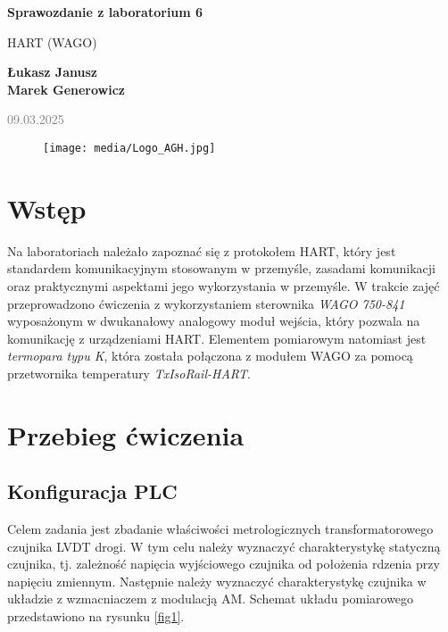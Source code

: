 \documentclass{article}
\begin{document}
\begin{titlepage}
    \begin{center}
        \vspace*{1cm}
            
        \Huge
        \textbf{Sprawozdanie z laboratorium 6}
            
        \vspace{0.5cm}
        \LARGE
        HART (WAGO)
            
        \vspace{1.5cm}
            
        \textbf{Łukasz Janusz\\Marek Generowicz}

        \normalsize      
        \textcolor{gray}{09.03.2025}
        \vfill
        \begin{figure}[hb]
            \centering
            \texttt{[image: media/Logo\_AGH.jpg]}
        \end{figure}
                        
            
    \end{center}
\end{titlepage}

\section{Wstęp}
Na laboratoriach należało zapoznać się z protokołem HART, który jest standardem komunikacyjnym stosowanym w przemyśle, zasadami komunikacji oraz praktycznymi aspektami jego wykorzystania w przemyśle. W trakcie zajęć przeprowadzono ćwiczenia z wykorzystaniem sterownika \textit{WAGO 750-841} wyposażonym w dwukanałowy analogowy moduł wejścia, który pozwala na komunikację z urządzeniami HART. Elementem pomiarowym natomiast jest \textit{termopara typu K}, która została połączona z modułem WAGO za pomocą przetwornika temperatury \textit{TxIsoRail-HART}. 

\section{Przebieg ćwiczenia}

\subsection{Konfiguracja PLC}

Celem zadania jest zbadanie właściwości metrologicznych transformatorowego czujnika LVDT drogi. W tym celu należy wyznaczyć charakterystykę statyczną czujnika, tj. zależność napięcia wyjściowego czujnika od położenia rdzenia przy napięciu zmiennym. Następnie należy wyznaczyć charakterystykę czujnika w układzie z wzmacniaczem z modulacją AM. Schemat układu pomiarowego przedstawiono na rysunku \ref{fig1}.
\end{document}
